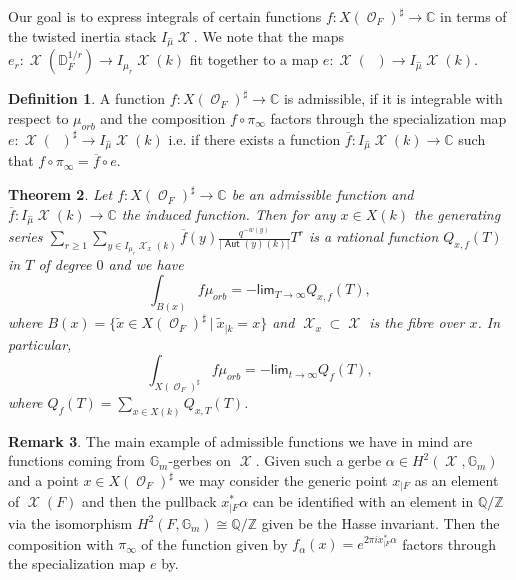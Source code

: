 \documentclass{article}
\DeclareMathOperator{\Xc}{\mathcal{X}}
\DeclareMathOperator{\Oc}{\mathcal{O}}
\renewcommand{\lim}{\mathsf{lim}}
\DeclareMathOperator{\Aut}{\mathsf{Aut}}
\newcommand{\BC}{{\mathbb{C}}}
\newcommand{\BG}{{\mathbb{G}}}
\newcommand{\BQ}{{\mathbb{Q}}}
\newcommand{\BZ}{{\mathbb{Z}}}
\newcommand{\Dr}[1][r]{\mathbb{D}_F^{1/#1}}
\DeclareMathOperator{\Dinfty}{\mathbb{D}_F^{1/\infty}}
\theoremstyle{definition}
\newtheorem{definition}{Definition}[section]
\newtheorem{rmk}[definition]{Remark}
\theoremstyle{plain}
\newtheorem{theorem}[definition]{Theorem}
\begin{document}
Our goal is to express integrals of certain functions $f:X(\Oc_F)^\sharp \to \BC$ in terms of the twisted inertia stack $I_{\hat \mu}\Xc$. We note that the maps $e_r\colon \Xc(\Dr) \to I_{\mu_r} \Xc(k)$ fit together to a map $e\colon \Xc(\Dinfty) \to I_{\hat \mu} \Xc(k).$

\begin{definition} A function $f:X(\Oc_F)^\sharp \to \BC$ is admissible, if it is integrable with respect to $\mu_{orb}$ and the composition $f  \circ \pi_{\infty}$ factors through the specialization map $e: \Xc(\Dinfty)^\sharp \to I_{\hat \mu}\Xc(k)$ i.e. if there exists a function $\overline{f}: I_{\hat \mu}\Xc(k) \to \BC$ such that $f  \circ \pi_{\infty} = \overline{f} \circ e$.
\end{definition}






\begin{theorem}\label{inbase} Let $f:X(\Oc_F)^\sharp \to \BC$ be an admissible function and $\overline{f}:I_{\hat \mu}\Xc(k) \to \BC$ the induced function. Then for any $x \in X(k)$ the generating series $\sum_{r\geq 1} \sum_{y \in I_{\mu_r}\Xc_x(k)}\overline{f}(y)\frac{q^{-w(y)}}{|\Aut(y)(k)|}T^r$ is a rational function $Q_{x,f}(T)$ in $T$ of degree $0$ and we have
\[ \int_{B(x)}f \mu_{orb} = -\lim_{T\to \infty}Q_{x,f}(T),  \]
    where $B(x) = \{ \tilde x \in X(\Oc_F)^\sharp \ |\ \tilde{x}_{|k} = x\}$ and $\Xc_x \subset \Xc$ is the fibre over $x$. In particular,
    \[\int_{X(\Oc_F)^\sharp} f \mu_{orb} = -\lim_{t\to \infty}Q_f(T),\]
    where $Q_f(T) = \sum_{x \in X(k)} Q_{x,T}(T)$.
    
\end{theorem}

\begin{rmk}\label{gerf} The main example of  admissible functions we have in mind are functions coming from $\BG_m$-gerbes on $\Xc$. Given such a gerbe $\alpha \in H^2(\Xc,\BG_m)$ and a point $x\in  X(\Oc_F)^\sharp$ we may consider the generic point $x_{|F}$ as an element of $\Xc(F)$ and then the pullback $x_{|F}^*\alpha$ can be identified with an element in $\BQ/\BZ$ via the isomorphism $H^2(F,\BG_m) \cong \BQ/\BZ$ given be the Hasse invariant. Then the composition with $\pi_\infty$ of the function given by $f_\alpha(x) = e^{2 \pi i x_{|F}^*\alpha}$ factors through the specialization map $e$ by\cite[Lemma 3.10]{GWZ20b}.
\end{rmk}
 
\end{document}
